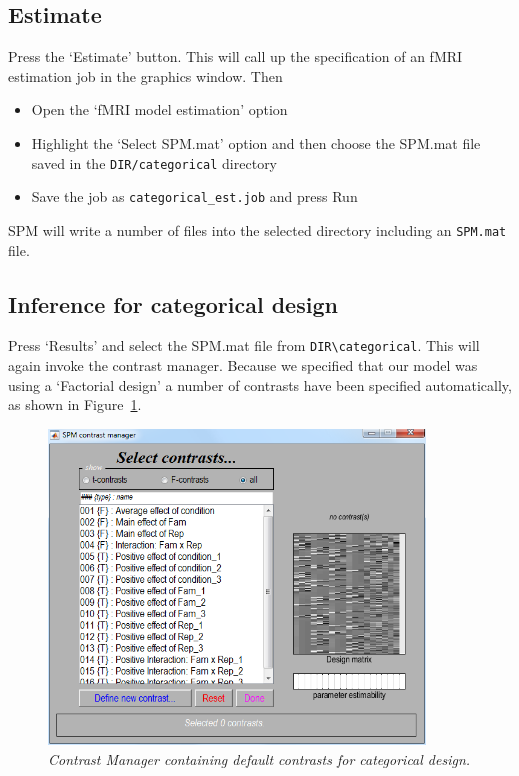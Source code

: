 \documentclass[a4paper,titlepage]{book}
\newcommand{\bi}{\begin{itemize}}
\newcommand{\ei}{\end{itemize}}
\begin{document}
\subsection{Estimate}

Press the `Estimate' button. This will call up the specification of an fMRI estimation job in the graphics window. Then
\bi
\item{Open the `fMRI model estimation' option}
\item{Highlight the `Select SPM.mat' option and then choose the SPM.mat
file saved in the \verb!DIR/categorical! directory}
\item{Save the job as \verb!categorical_est.job! and press Run}
\ei
SPM will write a number of files into the selected directory including 
an \verb!SPM.mat! file.

\subsection{Inference for categorical design}

Press `Results' and select the SPM.mat file from 
\verb!DIR\categorical!. This will again invoke the contrast manager. Because we specified that 
our model was using a `Factorial design' a number of 
contrasts have been specified automatically, as shown 
in Figure~\ref{cat_contrasts}.
\begin{figure}
\begin{center}
\includegraphics[width=100mm]{faces/cat_contrasts}
\caption{\em Contrast Manager containing default contrasts for categorical design. \label{cat_contrasts}}
\end{center}
\end{figure}
\end{document}
